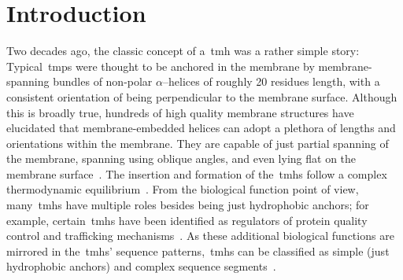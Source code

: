 \section{Introduction}

Two decades ago, the classic concept of a~\gls{tmh} was a rather simple story: Typical~\gls{tmp}s were thought to be anchored in the membrane by membrane-spanning bundles of non-polar \(\alpha\)--helices of roughly 20 residues length, with a consistent orientation of being perpendicular to the membrane surface.
Although this is broadly true, hundreds of high quality membrane structures have elucidated that membrane-embedded helices can adopt a plethora of lengths and orientations within the membrane.
They are capable of just partial spanning of the membrane, spanning using oblique angles, and even lying flat on the membrane surface~\cite{Elofsson2007, VonHeijne2006}.
The insertion and formation of the~\gls{tmh}s follow a complex thermodynamic equilibrium~\cite{Moon2013, MacCallum2011, Cymer2015}.
From the biological function point of view, many~\gls{tmh}s have multiple roles besides being just hydrophobic anchors; for example, certain~\gls{tmh}s have been identified as regulators of protein quality control and trafficking mechanisms~\cite{Hessa2011}.
As these additional biological functions are mirrored in the~\gls{tmh}s’ sequence patterns,~\gls{tmh}s can be classified as simple (just hydrophobic anchors) and complex sequence segments~\cite{Wong2010, Wong2011, Wong2012}.

